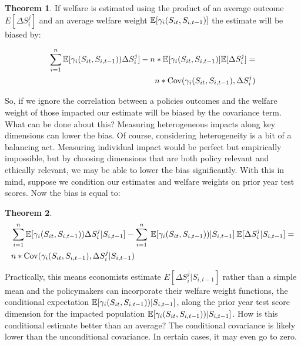 \documentclass[12pt]{article}
\theoremstyle{definition}
\theoremstyle{definition}
\theoremstyle{definition}
\theoremstyle{definition}
\newtheorem{thm}{Theorem}
\begin{document}
    \begin{thm}
    If welfare is estimated using the product of an average outcome $E[\Delta S_i^j]$ and an average welfare weight $\mathbb{E}[\gamma_i(S_{it}, S_{i,t-1})]$ the estimate will be biased by: 
    
    \begin{align}
       \sum_{i=1}^n \mathbb{E}[\gamma_i(S_{it}, S_{i,t-1})) \Delta S_i^j] -n * \mathbb{E}[\gamma_i(S_{it}, S_{i,t-1})]\mathbb{E}[\Delta S_i^j]  = & 
       \\ n * \mathrm{Cov}(\gamma_i(S_{it}, S_{i,t-1}), \Delta S_i^j) & 
    \end{align}
    \end{thm}



    So, if we ignore the correlation between a policies outcomes and the welfare weight of those impacted our estimate will be biased by the covariance term. What can be done about this? Measuring heterogeneous impacts along key dimensions can lower the bias. Of course, considering heterogeneity is a bit of a balancing act. Measuring individual impact would be perfect but empirically impossible, but by choosing dimensions that are both policy relevant and ethically relevant, we may be able to lower the bias significantly. With this in mind, suppose we condition our estimates and welfare weights on prior year test scores. Now the bias is equal to:

    \begin{thm}
    \label{cond_exp_1}
        \begin{align*}
           & \sum_{i=1}^n \mathbb{E}[\gamma_i(S_{it}, S_{i,t-1})) \Delta S_i^j| S_{i,t-1}] - \sum_{i=1}^n \: \mathbb{E}[\gamma_i(S_{it}, S_{i,t-1}))|S_{i,t-1}] \: \mathbb{E}[\Delta S_i^j|S_{i,t-1}] = \\
           &  n*\mathrm{Cov}(\gamma_i(S_{it}, S_{i,t-1}), \Delta S_i^j|S_{i,t-1})
        \end{align*}
    \end{thm}


    Practically, this means economists estimate $E[\Delta S_i^j|S_{i,t-1}]$ rather than a simple mean and the policymakers can incorporate their welfare weight functions, the conditional expectation $\mathbb{E}[\gamma_i(S_{it}, S_{i,t-1}))|S_{i,t-1}]$, along the prior year test score dimension for the impacted population $\mathbb{E}[\gamma_i(S_{it}, S_{i,t-1}))|S_{i,t-1}]$.  How is this conditional estimate better than an average? The conditional covariance is likely lower than the unconditional covariance. In certain cases, it may even go to zero. 
    
\end{document}
